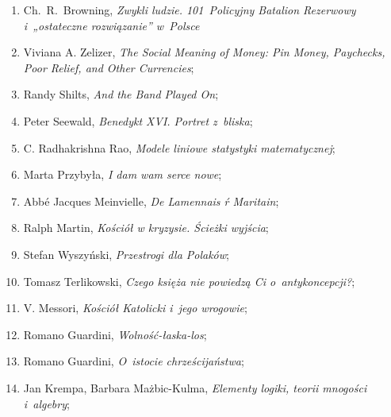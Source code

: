 \documentclass[a4paper,11pt]{article}
\begin{document}
\begin{enumerate}
\item Ch.~R.~Browning, \textit{Zwykli ludzie. 101~Policyjny Batalion
    Rezerwowy i~„ostateczne rozwiązanie” w~Polsce}



\item Viviana A. Zelizer, \textit{The Social Meaning of Money: Pin
    Money, Paychecks, Poor Relief, and Other Currencies};



\item Randy Shilts, \textit{And the Band Played On};



\item Peter Seewald, \textit{Benedykt XVI. Portret z~bliska};



\item C. Radhakrishna Rao, \textit{Modele liniowe statystyki matematycznej};



\item Marta Przybyła, \textit{I dam wam serce nowe};



\item Abbé Jacques Meinvielle, \textit{De Lamennais ŕ Maritain};



\item Ralph Martin, \textit{Kościół w kryzysie. Ścieżki wyjścia};



\item Stefan Wyszyński, \textit{Przestrogi dla Polaków};



\item Tomasz Terlikowski, \textit{Czego księża nie powiedzą Ci
    o~antykoncepcji?};



\item V. Messori, \textit{Kościół Katolicki i~jego wrogowie};



\item Romano Guardini, \textit{Wolność-łaska-los};



\item Romano Guardini, \textit{O~istocie chrześcijaństwa};



\item Jan Krempa, Barbara Mażbic-Kulma, \textit{Elementy logiki, teorii
    mnogości i~algebry};




\end{enumerate}
\end{document}
